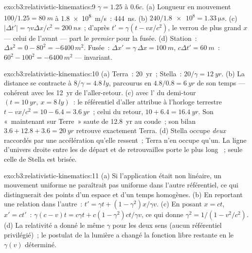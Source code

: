 \begin{solution}{exo:b3:relativistic-kinematics:9}
$\gamma = 1.25$ à $0.6c$. (a) Longueur en mouvement $100/1.25 = \qty{80}{m}$
à \qty{1.8e8}{m/s}~: \qty{444}{ns}. (b) $240/\num{1.8e8} =
\qty{1.33}{\micro s}$. (c) $|\Delta t'| = \gamma v\Delta x/c^2 =
\qty{200}{ns}$~; d'après $t' = \gamma(t - vx/c^2)$, le verrou de plus
grand $x$ --- celui de l'avant --- part le \emph{premier} pour la
fusée. (d) Station~: $\Delta s^2 = 0 - 80^2 = -6400\,\unit{m^2}$. Fusée~: $\Delta
x' = \gamma\,\Delta x = \qty{100}{m}$, $c\Delta t' = \qty{60}{m}$~:
$60^2 - 100^2 = -6400\,\unit{m^2}$ --- invariant.
\end{solution}

\begin{solution}{exo:b3:relativistic-kinematics:10}
(a) Terra~: \qty{20}{yr}~; Stella~: $20/\gamma = \qty{12}{yr}$. (b) La
distance se contracte à $8/\gamma = \qty{4.8}{ly}$, parcourus en $4.8/0.8
= \qty{6}{yr}$ de son temps --- cohérent avec les \qty{12}{yr} de
l'aller-retour. (c)  avec l' du demi-tour $(t =
\qty{10}{yr},\ x = \qty{8}{ly})$~: le référentiel d'aller attribue à
l'horloge terrestre $t - vx/c^2 = 10 - 6.4 = \qty{3.6}{yr}$~; celui du retour, $10 +
6.4 = \qty{16.4}{yr}$. Son «~maintenant sur Terre~» saute de \qty{12.8}{yr}
au coude~; son bilan $3.6 + 12.8 + 3.6 = \qty{20}{yr}$
retrouve exactement Terra. (d) Stella occupe \emph{deux}  raccordés par une accélération qu'elle ressent~; Terra n'en
occupe qu'un. La ligne d'univers droite entre les  de départ
et de retrouvailles porte le plus long ~; seule celle de
Stella est brisée.
\end{solution}

\begin{solution}{exo:b3:relativistic-kinematics:11}
(a) Si l'application était non linéaire, un mouvement uniforme ne
paraîtrait pas uniforme dans l'autre référentiel, ce qui distinguerait
des points d'un espace et d'un temps homogènes. (b) En reportant une
relation dans l'autre~: $t' = \gamma t +
(1 - \gamma^2)x/\gamma v$. (c) En posant $x = ct$, $x' = ct'$~:
$\gamma(c - v)t = c\gamma t + c(1 - \gamma^2)ct/\gamma v$, ce qui donne
$\gamma^2 = 1/(1 - v^2/c^2)$. (d) La relativité a donné le même
$\gamma$ pour les deux sens (aucun référentiel privilégié)~; le
postulat de la lumière a changé la fonction libre restante en le
$\gamma(v)$ déterminé.
\end{solution}

